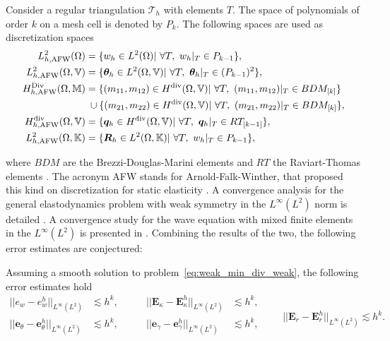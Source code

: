 Consider a regular triangulation $\mathcal{T}_h$ with elements $T$. The space of polynomials of order $k$ on a mesh cell is denoted by $P_k$. The following spaces are used as discretization spaces
\begin{equation}
\label{eq:AFW}
\begin{aligned}
L_{h, \text{AFW}}^2(\Omega) &= \{w_h \in L^2(\Omega) | \ \forall T, \ w_h|_{T} \in P_{k-1} \}, \\
L_{h, \text{AFW}}^2(\Omega, \mathbb{V}) &= \{\bm{\theta}_h \in L^2(\Omega, \mathbb{V}) | \ \forall T,\ \bm{\theta}_h|_{T} \in (P_{k-1})^2 \}, \\
H_{h, \text{AFW}}^{\Div}(\Omega, \mathbb{M}) &= \{(m_{11}, m_{12}) \in H^{\div}(\Omega, \mathbb{V})| \ \forall T,\ (m_{11}, m_{12})|_{T} \in BDM_{[k]} \}  \\
& \; \cup \{(m_{21}, m_{22}) \in H^{\div}(\Omega, \mathbb{V})| \ \forall T,\ (m_{21}, m_{22})|_{T} \in BDM_{[k]} \}, \\
H_{h, \text{AFW}}^{\div}(\Omega, \mathbb{V}) &= \{\bm{q}_h \in H^{\div}(\Omega, \mathbb{V}) | \ \forall T,\ \bm{q}_h|_{T} \in RT_{[k-1]} \}, \\
L_{h, \text{AFW}}^2(\Omega, \mathbb{K}) &= \{\bm{R}_h \in L^2(\Omega, \mathbb{K}) | \ \forall T, \ w_h|_{T} \in P_{k-1} \}, \\ 
\end{aligned}
\end{equation}

where $BDM$ are the Brezzi-Douglas-Marini elements \cite{brezzi1985bdm} and $RT$ the Raviart-Thomas elements \cite{raviart1977}. The acronym AFW stands for Arnold-Falk-Winther, that proposed this kind on discretization for static elasticity \cite{arnold2007mixed}. A convergence analysis for the general elastodynamics problem with weak symmetry in the $L^\infty (L^2)$ norm is detailed \cite{arnold2014elastodynamics}. A convergence study for the wave equation with mixed finite elements in the $L^\infty (L^2)$ is presented in \cite{geveci1988}. Combining the results of the two, the following error estimates are conjectured:
\begin{conjecture}\label{conj:AWFestimates}
	Assuming a smooth solution to problem~\eqref{eq:weak_min_div_weak}, the following error estimates hold 
	\begin{equation}
	\label{eq:errAFW}
	\begin{aligned}
	||e_w - e_w^h||_{L^{\infty}(L^2)} &\lesssim h^{k}, \\
	||\bm{e}_\theta - \bm{e}_\theta^h||_{L^{\infty}(L^2)} &\lesssim h^{k}, \\
	\end{aligned} \qquad
	\begin{aligned}
	||\bm{E}_\kappa - \bm{E}_\kappa^h||_{L^{\infty}(L^2)} &\lesssim  h^{k}, \\
	||\bm{e}_\gamma - \bm{e}_\gamma^ h||_{L^{\infty}(L^2)} &\lesssim  h^{k}, \\
	\end{aligned} \qquad
	||\bm{E}_r - \bm{E}_r^h||_{L^{\infty}(L^2)} \lesssim h^{k}. 
	\end{equation}
\end{conjecture}

